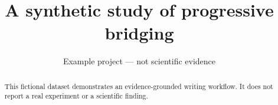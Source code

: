 \documentclass{article}
\title{A synthetic study of progressive bridging}
\author{Example project — not scientific evidence}
\begin{document}
\maketitle
\begin{abstract}
This fictional dataset demonstrates an evidence-grounded writing workflow.
It does not report a real experiment or a scientific finding.
\end{abstract}




\end{document}
